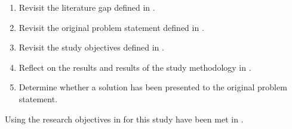 \begin{enumerate}[label=\textbf{\Roman*.}]
	\item Revisit the literature gap defined in .
	\item Revisit the original problem statement defined in .
	\item Revisit the study objectives defined in .
	\item Reflect on the results and results of the study methodology in .
	\item Determine whether a solution has been presented to the original problem statement. 
\end{enumerate}

Using the research objectives in  for this study have been met in . 

